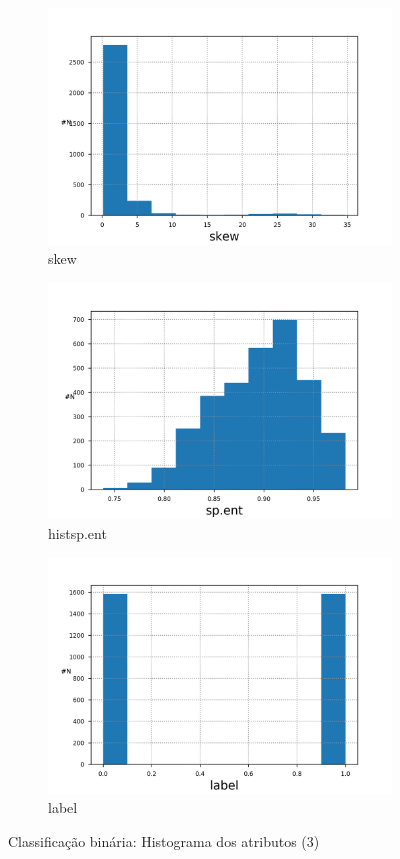 \documentclass{article}
\begin{document}
        \begin{figure}[H]
            \begin{subfigure}{.5\textwidth}
                \centering
                \includegraphics[width=.8\linewidth]{img1/data_histskew.png}
                \caption{skew}
            \end{subfigure}
            \begin{subfigure}{.5\textwidth}
                \centering
                \includegraphics[width=.8\linewidth]{img1/data_histsp_ent.png}
                \caption{histsp.ent}
            \end{subfigure}
            \begin{subfigure}{.5\textwidth}
                \centering
                \includegraphics[width=.8\linewidth]{img1/data_histlabel.png}
                \caption{label}
            \end{subfigure}
        \caption{Classificação binária: Histograma dos atributos (3)}
        \label{fig:a_hist_3}
        \end{figure}
\end{document}
